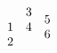 \documentclass{article}
\begin{document}
\[ \begin{array}[t]{c} 1\\2\end{array} \begin{array}[b]{c} 3\\4\end{array} \begin{array}{c} 5\\6\end{array} \]
\end{document}
